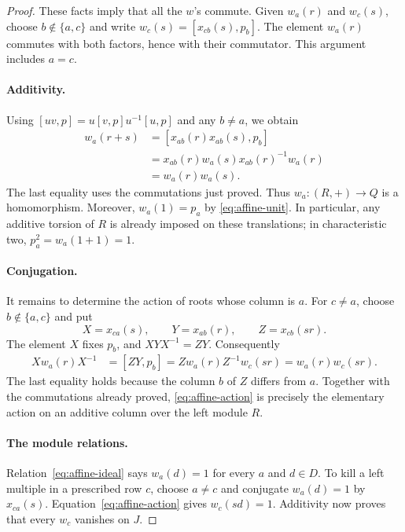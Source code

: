 \begin{proof}
These facts imply that all the $w$'s commute.  Given $w_a(r)$ and
$w_c(s)$, choose $b\notin\{a,c\}$ and write
$w_c(s)=[x_{cb}(s),p_b]$.  The element $w_a(r)$ commutes with both
factors, hence with their commutator.  This argument includes $a=c$.

\paragraph{Additivity.}
Using $[uv,p]=u[v,p]u^{-1}[u,p]$ and any $b\ne a$, we obtain
\begin{align*}
 w_a(r+s)
  &=[x_{ab}(r)x_{ab}(s),p_b]\\
  &=x_{ab}(r)w_a(s)x_{ab}(r)^{-1}w_a(r)\\
  &=w_a(r)w_a(s).
\end{align*}
The last equality uses the commutations just proved.  Thus
$w_a:(R,+)\to Q$ is a homomorphism.  Moreover,
$w_a(1)=p_a$ by \eqref{eq:affine-unit}.  In particular, any additive
torsion of $R$ is already imposed on these translations; in
characteristic two, $p_a^2=w_a(1+1)=1$.

\paragraph{Conjugation.}
It remains to determine the action of roots whose column is $a$.
For $c\ne a$, choose $b\notin\{a,c\}$ and put
\[
 X=x_{ca}(s),\qquad Y=x_{ab}(r),\qquad Z=x_{cb}(sr).
\]
The element $X$ fixes $p_b$, and $XYX^{-1}=ZY$.
Consequently
\begin{align}
 Xw_a(r)X^{-1}
    &=[ZY,p_b]
      =Zw_a(r)Z^{-1}w_c(sr)
      =w_a(r)w_c(sr).\label{eq:affine-action}
\end{align}
The last equality holds because the column $b$ of $Z$ differs
from $a$.  Together with the commutations already proved,
\eqref{eq:affine-action} is precisely the elementary action on
an additive column over the left module $R$.

\paragraph{The module relations.}
Relation~\eqref{eq:affine-ideal} says $w_a(d)=1$ for every $a$ and
$d\in D$.  To kill a left multiple in a prescribed row $c$, choose
$a\ne c$ and conjugate $w_a(d)=1$ by $x_{ca}(s)$.
Equation~\eqref{eq:affine-action} gives $w_c(sd)=1$.
Additivity now proves that every $w_c$ vanishes on $J$.


\end{proof}
